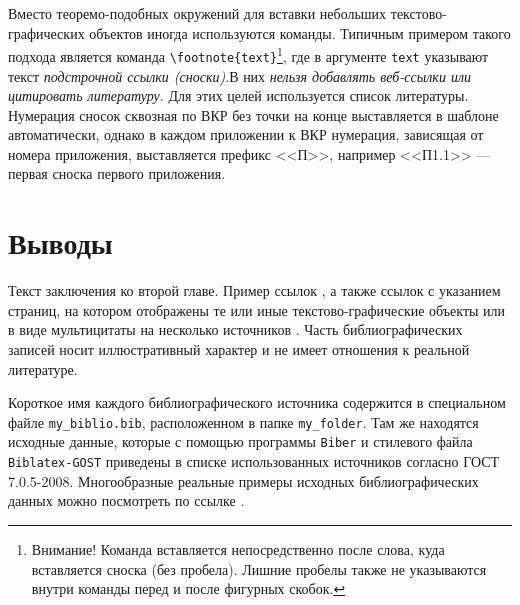 





Вместо теоремо-подобных окружений для вставки небольших текстово-графических объектов иногда используются команды. Типичным примером такого подхода является команда \verb|\footnote{text}|\footnote{Внимание! Команда вставляется непосредственно после слова, куда вставляется сноска (без пробела). Лишние пробелы также не указываются внутри команды перед и после фигурных скобок.}, где в аргументе \verb|text| указывают текст \textit{подстрочной ссылки (сноски)}.В них \textit{нельзя добавлять веб-ссылки или цитировать литературу}. Для этих целей используется список литературы. Нумерация сносок сквозная по ВКР без точки на конце выставляется в шаблоне автоматически, однако в каждом приложении к ВКР нумерация, зависящая от номера приложения, выставляется префикс <<П>>, например <<П1.1>> --- первая сноска первого приложения. 






\section{Выводы} \label{ch2:conclusion}

Текст заключения ко второй главе. Пример ссылок \cite{Article,Book,Booklet,Conference,Inbook,Incollection,Manual,Mastersthesis,Misc,Phdthesis,Proceedings,Techreport,Unpublished,badiou:briefings}, а также ссылок с указанием страниц, на котором отображены те или иные текстово-графические объекты  \cite[с.~96]{Naidenova2017} или в виде мультицитаты на несколько источников \cites[с.~96]{Naidenova2017}[с.~46]{Ganter1999}. Часть библиографических записей носит иллюстративный характер и не имеет отношения к реальной литературе. 

Короткое имя каждого библиографического источника содержится в специальном файле \verb|my_biblio.bib|, расположенном в папке \verb|my_folder|. Там же находятся исходные данные, которые с помощью программы \texttt{Biber} и стилевого файла \texttt{Biblatex-GOST} \cite{ctan-biblatex-gost} приведены в списке использованных источников согласно ГОСТ 7.0.5-2008.
Многообразные реальные примеры исходных библиографических данных можно посмотреть по ссылке \cite{ctan-biblatex-gost-examples}.

